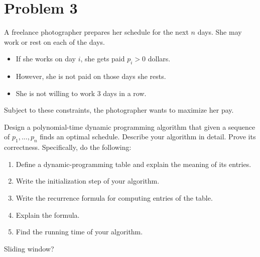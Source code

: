 \newpage
\section{Problem 3}
A freelance photographer prepares her schedule for the next $n$ days. She may work or rest on each of the days.
\begin{itemize}
    \item If she works on day $i$, she gets paid $p_i > 0$ dollars.
    \item However, she is not paid on those days she rests.
    \item She is not willing to work 3 days in a row.
\end{itemize}
Subject to these constraints, the photographer wants to maximize her pay.\par
Design a polynomial-time dynamic programming algorithm that given a sequence of $p_1, ..., p_n$ finds an optimal schedule. Describe your algorithm in detail. Prove its correctness. Specifically, do the following:
\begin{enumerate}
    \item Define a dynamic-programming table and explain the meaning of its entries.
    \item Write the initialization step of your algorithm.
    \item Write the recurrence formula for computing entries of the table.
    \item Explain the formula.
    \item Find the running time of your algorithm.
\end{enumerate}
\partbreak
\begin{solution}
    
Sliding window?
\end{solution}

